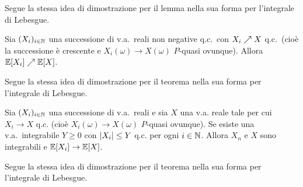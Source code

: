 \begin{multicols*}{2}
\begin{lemma}[di Fatou]
    Segue la stessa idea di dimostrazione per il lemma nella sua forma per l'integrale di Lebesgue.
\end{lemma}

\begin{theorem}
    Sia $(X_i)_{i \in \mathbb{N}}$ una successione di v.a.~reali non negative q.c.~con
    $X_i \nearrow X$ q.c.~(cioè la successione è crescente e
    $X_i(\omega) \to X(\omega)$ $P$-quasi ovunque). Allora $\mathbb{E}[X_i] \nearrow \mathbb{E}[X]$. \smallskip


    Segue la stessa idea di dimostrazione per il teorema nella sua forma per l'integrale di Lebesgue.
\end{theorem}

\begin{theorem}
    Sia $(X_i)_{i \in \mathbb{N}}$ una successione di v.a.~reali e sia $X$ una v.a. reale tale per cui
    $X_i \to X$ q.c. (cioè $X_i(\omega) \to X(\omega)$ $P$-quasi ovunque). Se esiste una
    v.a.~integrabile $Y \geq 0$ con $\left\lvert X_i \right\rvert \leq Y$ q.c. per ogni $i \in \mathbb{N}$. Allora $X_n$ e
    $X$ sono integrabili e $\mathbb{E}[X_i] \to \mathbb{E}[X]$. \smallskip


    Segue la stessa idea di dimostrazione per il teorema nella sua forma per l'integrale di Lebesgue.
\end{theorem}

\end{multicols*}